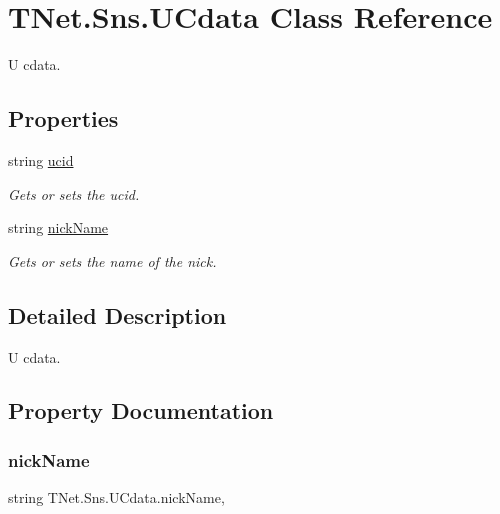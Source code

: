 \hypertarget{class_t_net_1_1_sns_1_1_u_cdata}{}\section{T\+Net.\+Sns.\+U\+Cdata Class Reference}
\label{class_t_net_1_1_sns_1_1_u_cdata}


U cdata.  


\subsection*{Properties}
\begin{DoxyCompactItemize}
\item 
string \mbox{\hyperlink{class_t_net_1_1_sns_1_1_u_cdata_a03c26e0d5706bc4d7f8207dce0263bb7}{ucid}}
\begin{DoxyCompactList}\small\item\em Gets or sets the ucid. \end{DoxyCompactList}\item 
string \mbox{\hyperlink{class_t_net_1_1_sns_1_1_u_cdata_a400223c8acc2f6fdfc0293e24fb06029}{nick\+Name}}
\begin{DoxyCompactList}\small\item\em Gets or sets the name of the nick. \end{DoxyCompactList}\end{DoxyCompactItemize}


\subsection{Detailed Description}
U cdata. 



\subsection{Property Documentation}
\mbox{\label{class_t_net_1_1_sns_1_1_u_cdata_a400223c8acc2f6fdfc0293e24fb06029}} 
\subsubsection{\texorpdfstring{nick\+Name}{nickName}}
{\footnotesize\ttfamily string T\+Net.\+Sns.\+U\+Cdata.\+nick\+Name\hspace{0.3cm}{\ttfamily [get]}, {\ttfamily [set]}}



